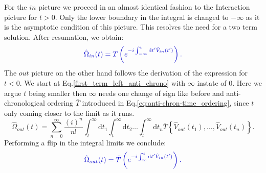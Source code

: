 \documentclass[
11pt, %
english, %
singlespacing, %
headsepline, %
]{MastersDoctoralThesis} %
\begin{document}
For the $ in $ picture we proceed in an almost identical fashion to the Interaction picture for $ t > 0 $. Only the lower boundary in the integral is changed to $ -\infty $ as it is the asymptotic condition of this picture. This resolves the need for a two term solution. 
After resumation, we obtain:
\begin{equation}\label{eq:Omega_in_converg}
\textcolor[RGB]{0,0,204}{
\hat{\Omega}_{in}(t)
= T\left( e^{-i\int_{-\infty}^{t}\mathrm{d}t^{\prime} \hat{V}_{in}(t^{\prime})} \right)
	.}
\end{equation}
The $ out $ picture on the other hand follows the derivation of the expression for $ t < 0 $. We start at Eq.\enskip\eqref{first_term_left_anti_chrono} with $ \infty $ instate of $ 0 $. Here we argue $ t $ being smaller then $ \infty $ needs one change of sign like before and anti-chronological ordering $ \bar{T} $ introduced in Eq.\enskip\eqref{eq:anti-chron-time_ordering}, since $ t $ only coming closer to the limit as it runs.
\begin{equation}
\hat{\Omega}_{out}(t) =
\sum\limits_{n=0}^{\infty} 
\frac{(i)^{n}}{n!}
\int^{\infty}_{t}\mathrm{d}t_1\int^{\infty}_{t}\! \! \mathrm{d}t_2
 \ldots
 \int^{\infty}_{t}\! \! \mathrm{d}t_n
 \bar{T}\left\lbrace \hat{V}_{out}(t_1), \ldots , \hat{V}_{out}(t_n)\right\rbrace .
\end{equation}
Performing a flip in the integral limits we conclude:
\begin{equation}\label{eq:Omega_out_converg}
\textcolor[RGB]{0,0,204}{
\hat{\Omega}_{out}(t)
= \bar{T}\left( e^{-i\int_{\infty}^{t}\mathrm{d}t^{\prime} \hat{V}_{in}(t^{\prime})} \right)
	.}
\end{equation}
\end{document}
